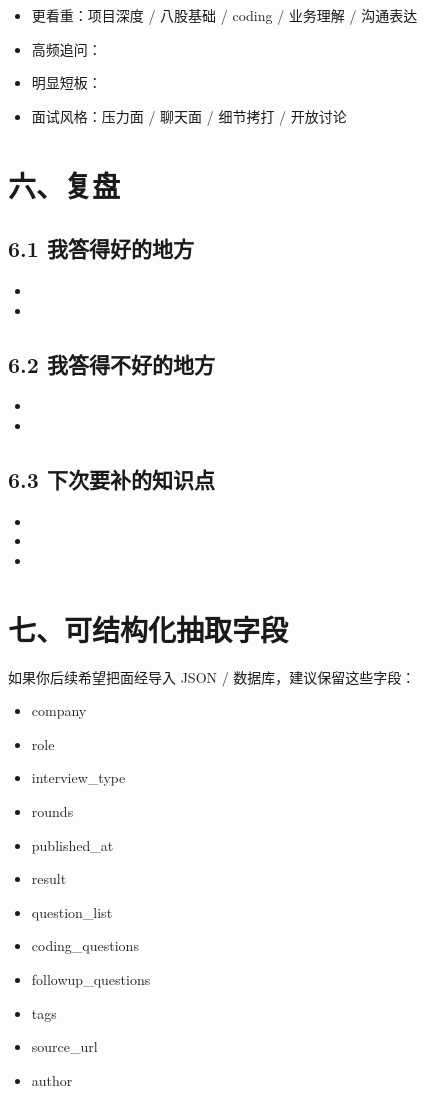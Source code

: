 \documentclass[UTF8,a4paper,11pt]{ctexart}
\begin{document}
\begin{itemize}
  \item 更看重：项目深度 / 八股基础 / coding / 业务理解 / 沟通表达
  \item 高频追问：\underline{\hspace{20em}}
  \item 明显短板：\underline{\hspace{20em}}
  \item 面试风格：压力面 / 聊天面 / 细节拷打 / 开放讨论
\end{itemize}

\section*{六、复盘}

\subsection*{6.1 我答得好的地方}
\begin{itemize}
  \item 
  \item 
\end{itemize}

\subsection*{6.2 我答得不好的地方}
\begin{itemize}
  \item 
  \item 
\end{itemize}

\subsection*{6.3 下次要补的知识点}
\begin{itemize}
  \item 
  \item 
  \item 
\end{itemize}

\section*{七、可结构化抽取字段}

如果你后续希望把面经导入 JSON / 数据库，建议保留这些字段：

\begin{itemize}
  \item company
  \item role
  \item interview\_type
  \item rounds
  \item published\_at
  \item result
  \item question\_list
  \item coding\_questions
  \item followup\_questions
  \item tags
  \item source\_url
  \item author
\end{itemize}
\end{document}

